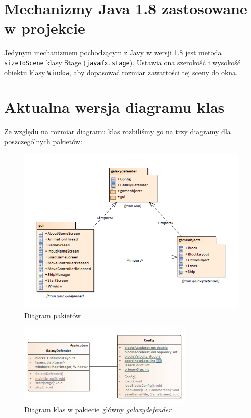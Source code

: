 \documentclass[a4paper]{article}
\newcommand{\prog}{\texttt}
\begin{document}
\section{Mechanizmy Java 1.8 zastosowane w projekcie}
Jedynym mechanizmem pochodzącym z Javy w wersji 1.8 jest metoda \prog{sizeToScene} klasy Stage (\prog{javafx.stage}). Ustawia ona szerokość i wysokość obiektu klasy \prog{Window}, aby dopasować rozmiar zawartości tej sceny do okna.

\section{Aktualna wersja diagramu klas}
Ze względu na rozmiar diagramu klas rozbiliśmy go na trzy diagramy dla poszczególnych pakietów:
\begin{figure}[H]
    \centering
    \includegraphics[width=1\textwidth]{img/packages.png}
    \caption{Diagram pakietów}
    \label{fig:packages}
\end{figure}

\begin{figure}[H]
    \centering
    \includegraphics[width=0.75\textwidth]{img/pakiet-galaxydefender.png}
    \caption{Diagram klas w pakiecie główny \textit{galaxydefender}}
    \label{fig:pack1}
\end{figure}
\end{document}
